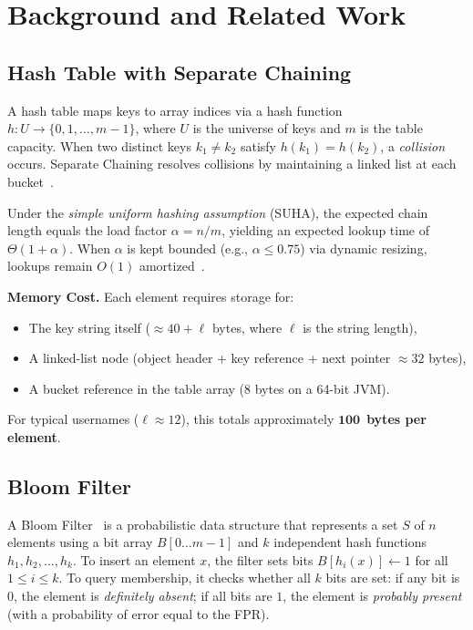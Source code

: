 \section{Background and Related Work}
\label{sec:background}

\subsection{Hash Table with Separate Chaining}
\label{subsec:hashtable}

A hash table maps keys to array indices via a hash function $h: U \to \{0, 1, \ldots, m-1\}$, where $U$ is the universe of keys and $m$ is the table capacity. When two distinct keys $k_1 \neq k_2$ satisfy $h(k_1) = h(k_2)$, a \emph{collision} occurs. Separate Chaining resolves collisions by maintaining a linked list at each bucket~\citep{cormen2022}.

Under the \emph{simple uniform hashing assumption} (SUHA), the expected chain length equals the load factor $\alpha = n/m$, yielding an expected lookup time of $\Theta(1 + \alpha)$. When $\alpha$ is kept bounded (e.g., $\alpha \leq 0.75$) via dynamic resizing, lookups remain $O(1)$ amortized~\citep{knuth1998}.

\textbf{Memory Cost.} Each element requires storage for:
\begin{itemize}[nosep]
    \item The key string itself ($\approx 40 + \ell$ bytes, where $\ell$ is the string length),
    \item A linked-list node (object header + key reference + next pointer $\approx 32$ bytes),
    \item A bucket reference in the table array ($8$ bytes on a 64-bit JVM).
\end{itemize}
For typical usernames ($\ell \approx 12$), this totals approximately $\mathbf{100}$~\textbf{bytes per element}.

\subsection{Bloom Filter}
\label{subsec:bloomfilter}

A Bloom Filter~\citep{bloom1970} is a probabilistic data structure that represents a set $S$ of $n$ elements using a bit array $B[0 \ldots m{-}1]$ and $k$ independent hash functions $h_1, h_2, \ldots, h_k$. To insert an element $x$, the filter sets bits $B[h_i(x)] \gets 1$ for all $1 \leq i \leq k$. To query membership, it checks whether all $k$ bits are set: if any bit is $0$, the element is \emph{definitely absent}; if all bits are $1$, the element is \emph{probably present} (with a probability of error equal to the FPR).

